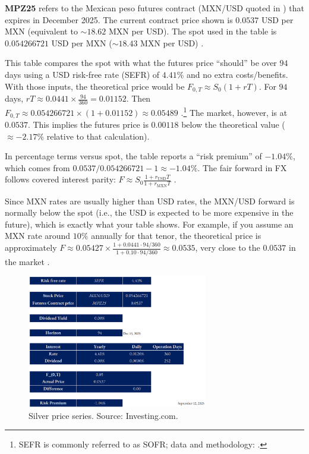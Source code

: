 \documentclass[11pt,a4paper]{article} %
\begin{document}
\textbf{MPZ25} refers to the Mexican peso futures contract (MXN/USD quoted in ) that expires in December 2025. The current contract price shown is \(0.0537\) USD per MXN (equivalent to \(\sim 18.62\) MXN per USD). The spot used in the table is \(0.054266721\) USD per MXN (\(\sim 18.43\) MXN per USD) \citep{cme_mxn_product,cme_mxn_rulebook}.

This table compares the spot with what the futures price “should” be over \(94\) days using a USD risk-free rate (SEFR) of \(4.41\%\) and no extra costs/benefits. With those inputs, the theoretical price would be \(F_{0,T} \approx S_0(1+rT)\). For \(94\) days, \(rT \approx 0.0441 \times \frac{94}{360} = 0.01152\). Then \(F_{0,T} \approx 0.054266721 \times (1+0.01152) \approx \mathbf{0.05489}\) \citep{frbny_sofr}.\footnote{SEFR is commonly referred to as SOFR; data and methodology: \citep{frbny_sofr,frbny_sofr_index}.}
The market, however, is at \(0.0537\). This implies the futures price is \(0.00118\) below the theoretical value (\(\approx -2.17\%\) relative to that calculation).

In percentage terms versus spot, the table reports a “risk premium” of \(-1.04\%\), which comes from \(0.0537/0.054266721 - 1 \approx -1.04\%\).
The fair forward in FX follows covered interest parity: \(F \approx S_0 \frac{1 + r_{\text{USD}} T}{1 + r_{\text{MXN}} T}\) \citep{bis_cip_2016,bis_cip_2024}.

Since MXN rates are usually higher than USD rates, the MXN/USD forward is normally below the spot (i.e., the USD is expected to be more expensive in the future), which is exactly what your table shows. For example, if you assume an MXN rate around \(10\%\) annually for that tenor, the theoretical price is approximately \(F \approx 0.05427 \times \frac{1 + 0.0441 \cdot 94/360}{1 + 0.10 \cdot 94/360} \approx 0.0535\), very close to the \(0.0537\) in the market \citep{bis_cip_2016}.

\begin{figure}[h]
\centering
\includegraphics[width=0.7\textwidth]{figures/usdmxn.png}
\caption{Silver price series. Source: Investing.com.}
\end{figure}
\end{document}

